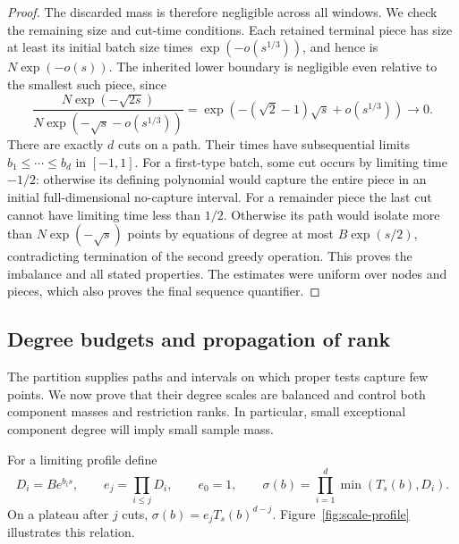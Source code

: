 \begin{proof}
The discarded mass is therefore negligible across all windows.
We check the remaining size and cut-time conditions.
Each retained terminal piece has size at least its initial batch size
times $\exp(-o(s^{1/3}))$, and hence is $N\exp(-o(s))$.  The inherited
lower boundary is negligible even relative to the smallest such
piece, since
\[
 \frac{N\exp(-\sqrt{2s})}
 {N\exp(-\sqrt{s}-o(s^{1/3}))}
 =\exp(-(\sqrt2-1)\sqrt{s}+o(s^{1/3}))\to0.
\]
There are exactly $d$ cuts on a path.  Their times have subsequential
limits $b_1\le\cdots\le b_d$ in $[-1,1]$.  For a first-type batch,
some cut occurs by limiting time $-1/2$: otherwise its defining
polynomial would capture the entire piece in an initial
full-dimensional no-capture interval.  For a remainder piece the
last cut cannot have limiting time less than $1/2$.  Otherwise its
path would isolate more than $N\exp(-\sqrt{s})$ points by equations
of degree at most $B\exp(s/2)$, contradicting termination of the
second greedy operation.  This proves the imbalance and all stated
properties.  The estimates were uniform over nodes and pieces, which
also proves the final sequence quantifier.
\end{proof}

\subsection{Degree budgets and propagation of rank}

The partition supplies paths and intervals on which proper tests
capture few points.  We now prove that their degree scales are
balanced and control both component masses and restriction ranks.
In particular, small exceptional component degree will imply small
sample mass.

For a limiting profile define
\begin{equation}\label{prof:profile-functions}
 D_i=B e^{b_i s},\qquad e_j=\prod_{i\le j}D_i,\qquad e_0=1,
 \qquad \sigma(b)=\prod_{i=1}^d\min(T_s(b),D_i).
\end{equation}
On a plateau after $j$ cuts, $\sigma(b)=e_jT_s(b)^{d-j}$.
Figure~\ref{fig:scale-profile} illustrates this relation.

